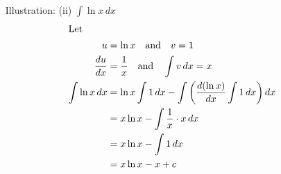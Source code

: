 \begin{enumerate}
\begin{enumerate}
                \item[Illustration: (ii)] $\int \ln x \, dx$
                    \begin{align*}
                        \intertext{Let } 
                        u &= \ln x \quad \text{and} \quad v = 1 \\
                        \frac{d u}{d x} &= \frac{1}{x} \quad \text{and} \quad \int v \, dx = x \\
                        \int \ln x \, dx &= \ln x \int 1 \, dx - \int \left( \frac{d (\ln x)}{d x} \int 1 \, dx \right) dx \\
                        &= x \ln x - \int \frac{1}{x} \cdot x \, dx \\
                        &= x \ln x - \int 1 \, dx \\
                        &= x \ln x - x + c
                    \end{align*}
            \end{enumerate}
\end{enumerate}
    
 

        
        

  
        
        